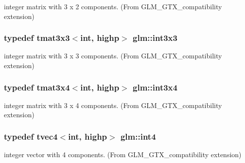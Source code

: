 integer matrix with 3 x 2 components. (From G\+L\+M\+\_\+\+G\+T\+X\+\_\+compatibility extension) 

\hypertarget{group__gtx__compatibility_ga4eb54b9ea96f12c04faaf2ca7b7c8c70}{}
\subsubsection[{int3x3}]{\setlength{\rightskip}{0pt plus 5cm}typedef tmat3x3$<$int, highp$>$ {\bf glm\+::int3x3}}\label{group__gtx__compatibility_ga4eb54b9ea96f12c04faaf2ca7b7c8c70}


integer matrix with 3 x 3 components. (From G\+L\+M\+\_\+\+G\+T\+X\+\_\+compatibility extension) 

\hypertarget{group__gtx__compatibility_ga7500192cce87fb3a48f7119d6646af5a}{}
\subsubsection[{int3x4}]{\setlength{\rightskip}{0pt plus 5cm}typedef tmat3x4$<$int, highp$>$ {\bf glm\+::int3x4}}\label{group__gtx__compatibility_ga7500192cce87fb3a48f7119d6646af5a}


integer matrix with 3 x 4 components. (From G\+L\+M\+\_\+\+G\+T\+X\+\_\+compatibility extension) 

\hypertarget{group__gtx__compatibility_gab93125af983ab22b9647b64770b26aa1}{}
\subsubsection[{int4}]{\setlength{\rightskip}{0pt plus 5cm}typedef tvec4$<$int, highp$>$ {\bf glm\+::int4}}\label{group__gtx__compatibility_gab93125af983ab22b9647b64770b26aa1}


integer vector with 4 components. (From G\+L\+M\+\_\+\+G\+T\+X\+\_\+compatibility extension) 

\hypertarget{group__gtx__compatibility_ga91c24f1a2df5d20ea98f97ec243782c3}{}
